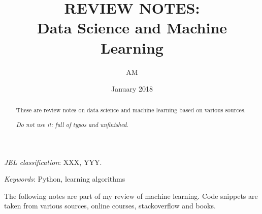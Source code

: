 \documentclass[12pt]{article}
\begin{document}


\title{REVIEW NOTES: \\
	Data Science and Machine Learning    
	}


\author{AM %
        }

\date{January 2018}  %


\renewcommand{\thefootnote}{\fnsymbol{footnote}}   

\singlespacing

\maketitle

\vspace{-.2in}
\begin{abstract}
\noindent These are review notes on data science and machine learning based on various sources. 

\centering\textit{Do not use it: full of typos and unfinished.} 
\end{abstract}

\medskip

\noindent \textit{JEL classification}: XXX, YYY.

\medskip
\noindent \textit{Keywords}: Python, learning algorithms %

\clearpage

\tableofcontents

\thispagestyle{empty}

\clearpage

\onehalfspacing
\setcounter{footnote}{0}
\renewcommand{\thefootnote}{\arabic{footnote}}
\setcounter{page}{1}
The following notes are part of my review of machine learning. Code snippets are taken from various sources, online courses, stackoverflow and books. 
\end{document}
